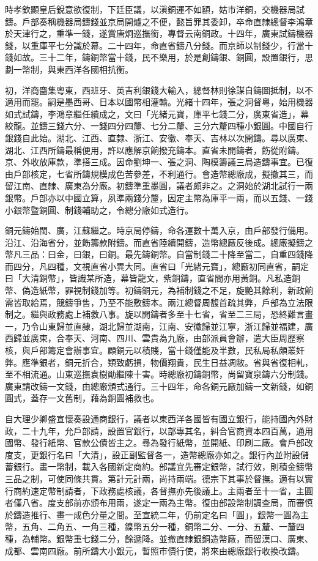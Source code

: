 \begin{pinyinscope}
時孝欽顯皇后銳意欲復制，下廷臣議，以滇銅運不如額，姑市洋銅，交機器局試鑄。戶部奏稱機器局鑄錢並京局開爐之不便，懿旨罪其委卸，卒命直隸總督李鴻章於天津行之，重準一錢，遂賞唐炯巡撫銜，專督云南銅政。十四年，廣東試鑄機器錢，以重庫平七分識於幕。二十四年，命直省鑄八分錢。而京師以制錢少，行當十錢如故。三十二年，鑄銅幣當十錢，民不樂用，於是創鑄銀、銅圓，設置銀行，思劃一幣制，與東西洋各國相抗衡。

初，洋商麕集粵東，西班牙、英吉利銀錢大輸入，總督林則徐謀自鑄圖抵制，以不適用而罷。嗣是墨西哥、日本以國幣相灌輸。光緒十四年，張之洞督粵，始用機器如式試鑄，李鴻章繼任續成之，文曰「光緒元寶，庫平七錢二分，廣東省造」，幕絞龍。並鑄三錢六分、一錢四分四釐、七分二釐、三分六釐四種小銀圓。中國自行銀錢自此始。湖北、江西、直隸、浙江、安徽、奉天、吉林以次開鑄。尋以廣東、湖北、江西所鑄最稱便用，許以應解京餉撥充鑄本。直省未開鑄者，飭從附鑄。京、外收放庫款，準搭三成。因命劉坤一、張之洞、陶模籌議三局造鑄事宜。已復由戶部核定，七省所鑄規模成色苦參差，不利通行。會造幣總廠成，擬撤其三，而留江南、直隸、廣東為分廠。初鑄準重墨圓，議者頗非之。之洞始於湖北試行一兩銀幣。戶部亦以中國立算，夙準兩錢分釐，因定主幣為庫平一兩，而以五錢、一錢小銀幣暨銅圓、制錢輔助之，令總分廠如式造行。

銅元鑄始閩、廣，江蘇繼之。時京局停鑄，命各運數十萬入京，由戶部發行備用。沿江、沿海省分，並飭籌款附鑄。而直省陸續開鑄，造幣總廠反後成。總廠擬鑄之幣凡三品：曰金，曰銀，曰銅。最先鑄銅幣。自當制錢二十降至當二，自重四錢降而四分，凡四種，文視直省小異大同。直省曰「光緒元寶」，總廠初同直省，嗣定曰「大清銅幣」，皆識某所造，幕皆龍文，紫銅鑄，直省間亦用黃銅。凡私造銅幣、偽造紙幣，罪視制錢加等。初鑄銅元，為補制錢之不足，旋艷其餘利，新政餉需皆取給焉，競鑄爭售，乃至不能敷鑄本。兩江總督周馥首疏其弊，戶部為立法限制之。繼與政務處上補救八事。旋以開鑄者多至十七省，省至二三局，恐終難言畫一，乃令山東歸並直隸，湖北歸並湖南，江南、安徽歸並江寧，浙江歸並福建，廣西歸並廣東，合奉天、河南、四川、雲貴為九廠，由部派員會辦，遣大臣周歷察核，與戶部籌定會辦事宜。顧銅元以積賤，當十錢僅能及半數，民私局私頗叢奸弊。應準銀者，銅元折合，類致虧損，物價翔貴，民生日益凋敝。省與省復相軋，至不相流通。山東巡撫袁樹勛繼陳十害。時總廠初鑄銅幣，尚留寶泉鑄六分制錢。廣東請改鑄一文錢，由總廠頒式通行。三十四年，命各銅元廠加鑄一文新錢，如銅圓式，蓋存一文舊制，藉為銅圓補救也。

自大理少卿盛宣懷奏設通商銀行，議者以東西洋各國皆有國立銀行，能持國內外財政，二十九年，允戶部請，設置官銀行，以部專其名，糾合官商資本四百萬，通用國幣、發行紙幣、官款公債皆主之。尋為發行紙幣，並開紙、印刷二廠。會戶部改度支，更銀行名曰「大清」，設正副監督各一，造幣總廠亦如之。銀行內並附設儲蓄銀行。畫一幣制，載入各國新定商約。部議宜先審定銀幣，試行效，則積金鑄幣三品之制，可使同條共貫。第計元計兩，尚持兩端。德宗下其事於督撫。適有以實行商約速定幣制請者，下政務處核議，各督撫亦先後議上。主兩者至十一省，主圓者僅八省。度支部前亦頒布用兩，遂定一兩為主幣。復由部設幣制調查局，而審慎於鑄造推行、畫一成色分量之間。至宣統二年，仍前定名曰「圓」，銀幣一圓為主幣，五角、二角五、一角三種，鎳幣五分一種，銅幣二分、一分、五釐、一釐四種，為輔幣。銀幣重七錢二分，餘遞降。並撤直隸銀銅造幣廠，而留漢口、廣東、成都、雲南四廠。前所鑄大小銀元，暫照市價行使，將來由總廠銀行收換改鑄。


\end{pinyinscope}
